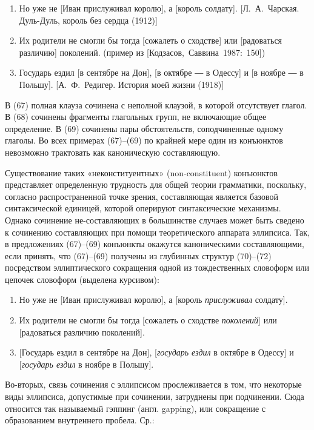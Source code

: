 \begin{enumerate}
\def\labelenumi{(\arabic{enumi})}
\setcounter{enumi}{66}
\item
  Но уже не {[}Иван прислуживал королю{]}, а {[}король солдату{]}.
  {[}Л.~А.~Чарская. Дуль-Дуль, король без сердца (1912){]}
\item
  Их родители не смогли бы тогда {[}сожалеть о сходстве{]} или
  {[}радоваться различию{]} поколений. (пример из
  {[}Кодзасов,~Саввина~1987:~150{]})
\item
  Государь ездил {[}в сентябре на Дон{]}, {[}в октябре ― в Одессу{]} и
  {[}в ноябре ― в Польшу{]}. {[}А.~Ф.~Редигер. История моей жизни
  (1918){]}
\end{enumerate}

В (67) полная клауза сочинена с неполной клаузой, в которой отсутствует
глагол. В (68) сочинены фрагменты глагольных групп, не включающие общее
определение. В (69) сочинены пары обстоятельств, соподчиненные одному
глаголы. Во всех примерах (67)--(69) по крайней мере один из конъюнктов
невозможно трактовать как каноническую составляющую.

Существование таких «неконституентных» (non-constituent) конъюнктов
представляет определенную трудность для общей теории грамматики,
поскольку, согласно распространенной точке зрения, составляющая является
базовой синтаксической единицей, которой оперируют синтаксические
механизмы. Однако сочинение не-составляющих в большинстве случаев может
быть сведено к сочинению составляющих при помощи теоретического аппарата
эллипсиса. Так, в предложениях (67)--(69) конъюнкты окажутся
каноническими составляющими, если принять, что (67)--(69) получены из
глубинных структур (70)--(72) посредством эллиптического сокращения
одной из тождественных словоформ или цепочек словоформ (выделена
курсивом):

\begin{enumerate}
\def\labelenumi{(\arabic{enumi})}
\setcounter{enumi}{69}
\item
  Но уже не {[}Иван прислуживал королю{]}, а {[}король
  \emph{прислуживал} солдату{]}.
\item
  Их родители не смогли бы тогда {[}сожалеть о сходстве
  \emph{поколений}{]} или {[}радоваться различию поколений{]}.
\item
  {[}Государь ездил в сентябре на Дон{]}, {[}\emph{государь ездил} в
  октябре в Одессу{]} и {[}\emph{государь ездил} в ноябре в Польшу{]}.
\end{enumerate}

Во-вторых, связь сочинения с эллипсисом прослеживается в том, что
некоторые виды эллипсиса, допустимые при сочинении, затруднены при
подчинении. Сюда относится так называемый гэппинг (англ. gapping), или
сокращение с образованием внутреннего пробела. Ср.:


